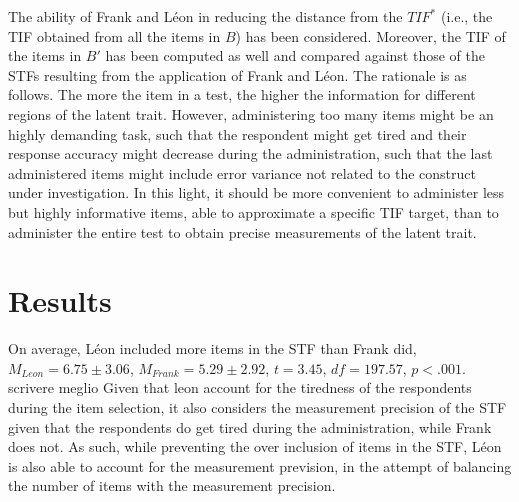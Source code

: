 \documentclass{svproc}
\begin{document}
The ability of Frank and Léon in reducing the distance from the $TIF^*$ (i.e., the TIF obtained from all the items in $B$) has been considered. 
Moreover, the TIF of the items in $B'$ has been computed as well and compared against those of the STFs resulting from the application of Frank and Léon. 
The rationale is as follows. The more the item in a test, the higher the information for different regions of the latent trait. 
However, administering too many items might be an highly demanding task, such that the respondent might get tired and their response accuracy might decrease during the administration, such that the last administered items might include error variance not related to the construct under investigation. 
In this light, it should be more convenient to administer less but highly informative items, able to approximate a specific TIF target, than to administer the entire test to obtain precise measurements of the latent trait.
  

\section{Results}

%

On average, Léon included more items in the STF than Frank did, $M_{Leon} = 6.75 \pm 3.06$, $M_{Frank} = 5.29 \pm 2.92$, $t = 3.45$, $df = 197.57$, $p < .001$. 
\color{red}
scrivere meglio 
Given that leon account for the tiredness of the respondents during the item selection, it also considers the measurement precision of the STF given that the respondents do get tired during the administration, while Frank does not. As such, while preventing the over inclusion of items in the STF, Léon is also able to account for the measurement prevision, in the attempt of balancing the number of items with the measurement precision.
\normalcolor
\end{document}

